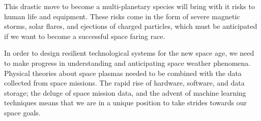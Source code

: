 This drastic move to become a multi-planetary species will bring with it risks to human life and 
equipment. These risks come in the form of severe magnetic storms, solar flares, and ejections of 
charged particles, which must be anticipated if we want to become a successful space faring race. 

In order to design resilient technological systems for the new space age, we need to make progress 
in understanding and anticipating space weather phenomena. Physical theories about space plasmas 
needed to be combined with the data collected from space missions. The rapid rise of hardware, 
software, and data storage; the deluge of space mission data, and the advent of machine learning 
techniques means that we are in a unique position to take strides towards our space goals.


%
%
